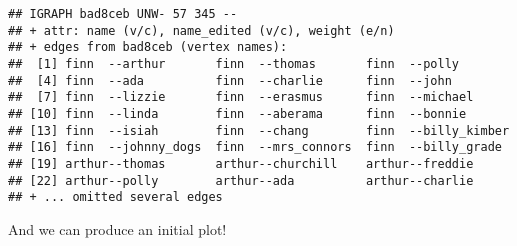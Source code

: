 \documentclass[
]{article}
\newenvironment{Shaded}{\begin{snugshade}}{\end{snugshade}}
\newcommand{\AttributeTok}[1]{\textcolor[rgb]{0.13,0.29,0.53}{#1}}
\newcommand{\ConstantTok}[1]{\textcolor[rgb]{0.56,0.35,0.01}{#1}}
\newcommand{\DecValTok}[1]{\textcolor[rgb]{0.00,0.00,0.81}{#1}}
\newcommand{\FunctionTok}[1]{\textcolor[rgb]{0.13,0.29,0.53}{\textbf{#1}}}
\newcommand{\NormalTok}[1]{#1}
\newcommand{\OtherTok}[1]{\textcolor[rgb]{0.56,0.35,0.01}{#1}}
\newcommand{\SpecialCharTok}[1]{\textcolor[rgb]{0.81,0.36,0.00}{\textbf{#1}}}
\newcommand{\StringTok}[1]{\textcolor[rgb]{0.31,0.60,0.02}{#1}}
\begin{document}
\begin{verbatim}
## IGRAPH bad8ceb UNW- 57 345 -- 
## + attr: name (v/c), name_edited (v/c), weight (e/n)
## + edges from bad8ceb (vertex names):
##  [1] finn  --arthur       finn  --thomas       finn  --polly       
##  [4] finn  --ada          finn  --charlie      finn  --john        
##  [7] finn  --lizzie       finn  --erasmus      finn  --michael     
## [10] finn  --linda        finn  --aberama      finn  --bonnie      
## [13] finn  --isiah        finn  --chang        finn  --billy_kimber
## [16] finn  --johnny_dogs  finn  --mrs_connors  finn  --billy_grade 
## [19] arthur--thomas       arthur--churchill    arthur--freddie     
## [22] arthur--polly        arthur--ada          arthur--charlie     
## + ... omitted several edges
\end{verbatim}

And we can produce an initial plot!

\begin{Shaded}
\end{Shaded}
\end{document}
